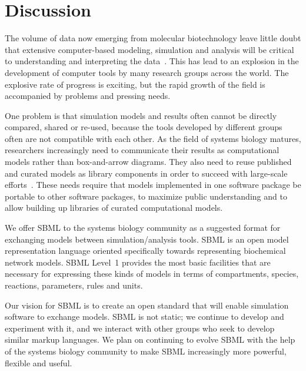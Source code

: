 \documentclass[10pt]{cekarticle}
\begin{document}
\section{Discussion}
\label{sec:discussion}

The volume of data now emerging from molecular biotechnology
leave little doubt that extensive computer-based modeling, simulation and
analysis will be critical to understanding and interpreting the
data~\citep{abbott:1999,gilman:2000,popel:1998,smaglik:2000}.  This
has lead to an explosion in the development of computer tools by many
research groups across the world.  The explosive rate of progress is
exciting, but the rapid growth of the field is accompanied by problems and
pressing needs.

One problem is that simulation models and results often cannot be directly
compared, shared or re-used, because the tools developed by different
groups often are not compatible with each other.  As the field of systems
biology matures, researchers increasingly need to communicate their results
as computational models rather than box-and-arrow diagrams.  They also need
to reuse published and curated models as library components in order to
succeed with large-scale efforts~\cite[e.g., the Alliance for Cellular
Signaling;][]{gilman:2000,smaglik:2000}.  These needs require that models
implemented in one software package be portable to other software packages,
to maximize public understanding and to allow building up libraries of
curated computational models.

We offer SBML to the systems biology community as a suggested format for
exchanging models between simulation/analysis tools.  SBML is an open model
representation language oriented specifically towards representing
biochemical network models.  SBML Level~1 provides the most basic
facilities that are necessary for expressing these kinds of models in terms
of compartments, species, reactions, parameters, rules and units.

Our vision for SBML is to create an open standard that will enable
simulation software to exchange models.  SBML is not static; we continue to
develop and experiment with it, and we interact with other groups who seek
to develop similar markup languages.  We plan on continuing to evolve SBML
with the help of the systems biology community to make SBML increasingly
more powerful, flexible and useful.
\end{document}
